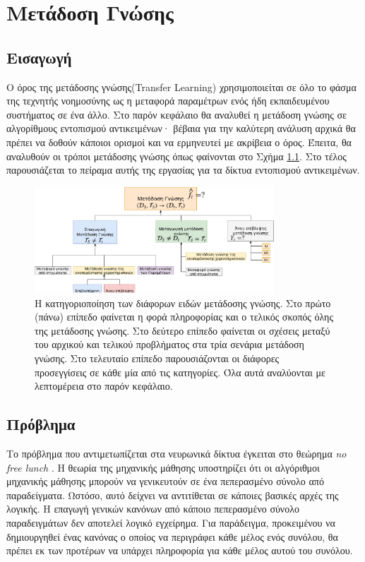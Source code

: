 \chapter{Μετάδοση Γνώσης}%
\label{chapter:tl}
\section{Εισαγωγή}
Ο όρος της μετάδοσης γνώσης(Transfer Learning) χρησιμοποιείται σε όλο το φάσμα της τεχνητής νοημοσύνης ως η μεταφορά παραμέτρων ενός ήδη εκπαιδευμένου συστήματος σε ένα άλλο. Στο παρόν κεφάλαιο θα αναλυθεί η μετάδοση γνώσης σε αλγορίθμους εντοπισμού αντικειμένων· βέβαια για την καλύτερη ανάλυση αρχικά θα πρέπει να δοθούν κάποιοι ορισμοί και να ερμηνευτεί με ακρίβεια ο όρος. Έπειτα, θα αναλυθούν οι τρόποι μετάδοσης γνώσης όπως φαίνονται στο Σχήμα \ref{fig:TL_categories}. Στο τέλος παρουσιάζεται το πείραμα αυτής της εργασίας για τα δίκτυα εντοπισμού αντικειμένων.

\begin{figure}
    \centering
    \includegraphics[width = 0.8\textwidth]{figures/transferLearning/TL_categorisation.pdf}
    \caption[Οι κατηγορίες της μετάδοσης γνώσης]{Η κατηγοριοποίηση των διάφορων ειδών μετάδοσης γνώσης. Στο πρώτο (πάνω) επίπεδο φαίνεται η φορά πληροφορίας και ο τελικός σκοπός όλης της μετάδοσης γνώσης. Στο δεύτερο επίπεδο φαίνεται οι σχέσεις μεταξύ του αρχικού και τελικού προβλήματος στα τρία σενάρια μετάδοση γνώσης. Στο τελευταίο επίπεδο παρουσιάζονται οι διάφορες προσεγγίσεις σε κάθε μία από τις κατηγορίες. Όλα αυτά αναλύονται με λεπτομέρεια στο παρόν κεφάλαιο.}
    \label{fig:TL_categories}
\end{figure}

\section{Πρόβλημα}
Το πρόβλημα που αντιμετωπίζεται στα νευρωνικά δίκτυα έγκειται στο θεώρημα \textit{no free lunch} \cite{37}. H
θεωρία της μηχανικής μάθησης υποστηρίζει ότι οι αλγόριθμοι μηχανικής μάθησης μπορούν να γενικευτούν σε ένα πεπερασμένο σύνολο από παραδείγματα. Ωστόσο, αυτό δείχνει να αντιτίθεται σε κάποιες βασικές αρχές της λογικής. Η επαγωγή γενικών κανόνων από κάποιο πεπερασμένο σύνολο παραδειγμάτων δεν αποτελεί λογικό εγχείρημα. Για παράδειγμα, προκειμένου να δημιουργηθεί ένας κανόνας ο οποίος να περιγράφει κάθε μέλος ενός συνόλου, θα πρέπει εκ των προτέρων να υπάρχει πληροφορία για κάθε μέλος αυτού του συνόλου.


